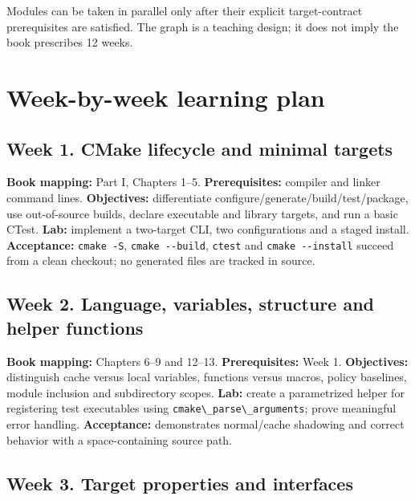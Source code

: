 \documentclass[11pt,letterpaper,oneside]{report}
\providecommand{\passthrough}[1]{#1}
\begin{document}
Modules can be taken in parallel only after their explicit
target-contract prerequisites are satisfied. The graph is a teaching
design; it does not imply the book prescribes 12 weeks.

\chapter{Week-by-week learning plan}\label{week-by-week-learning-plan}

\section{Week 1. CMake lifecycle and minimal
targets}\label{week-1.-cmake-lifecycle-and-minimal-targets}

\textbf{Book mapping:} Part I, Chapters 1--5. \textbf{Prerequisites:}
compiler and linker command lines. \textbf{Objectives:} differentiate
configure/generate/build/test/package, use out-of-source builds, declare
executable and library targets, and run a basic CTest. \textbf{Lab:}
implement a two-target CLI, two configurations and a staged install.
\textbf{Acceptance:} \passthrough{\lstinline!cmake -S!},
\passthrough{\lstinline!cmake --build!}, \passthrough{\lstinline!ctest!}
and \passthrough{\lstinline!cmake --install!} succeed from a clean
checkout; no generated files are tracked in source.

\section{Week 2. Language, variables, structure and helper
functions}\label{week-2.-language-variables-structure-and-helper-functions}

\textbf{Book mapping:} Chapters 6--9 and 12--13. \textbf{Prerequisites:}
Week 1. \textbf{Objectives:} distinguish cache versus local variables,
functions versus macros, policy baselines, module inclusion and
subdirectory scopes. \textbf{Lab:} create a parametrized helper for
registering test executables using
\passthrough{\lstinline!cmake\_parse\_arguments!}; prove meaningful
error handling. \textbf{Acceptance:} demonstrates normal/cache shadowing
and correct behavior with a space-containing source path.

\section{Week 3. Target properties and
interfaces}\label{week-3.-target-properties-and-interfaces}
\end{document}
